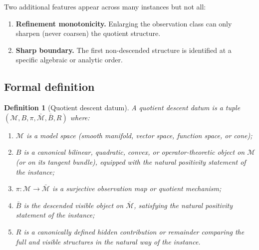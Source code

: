 \documentclass[11pt,a4paper]{article}
\numberwithin{equation}{section}
\theoremstyle{thmcompact}
\newtheorem{definition}[theorem]{Definition}
\theoremstyle{remark}
\begin{document}
Two additional features appear across many instances but not all:

\begin{enumerate}[label=(\roman*),start=6]
\item \textbf{Refinement monotonicity.} Enlarging the observation class can only sharpen (never coarsen) the quotient structure.
\item \textbf{Sharp boundary.} The first non-descended structure is identified at a specific algebraic or analytic order.
\end{enumerate}

\subsection{Formal definition}

\begin{definition}[Quotient descent datum]\label{def:qdd}
A \emph{quotient descent datum} is a tuple $(\mathcal{M}, B, \pi, \bar{\mathcal{M}}, \bar{B}, R)$ where:
\begin{enumerate}[label=(\alph*)]
\item $\mathcal{M}$ is a model space (smooth manifold, vector space, function space, or cone);
\item $B$ is a canonical bilinear, quadratic, convex, or operator-theoretic object on $\mathcal{M}$ (or on its tangent bundle), equipped with the natural positivity statement of the instance;
\item $\pi: \mathcal{M} \to \bar{\mathcal{M}}$ is a surjective observation map or quotient mechanism;
\item $\bar{B}$ is the descended visible object on $\bar{\mathcal{M}}$, satisfying the natural positivity statement of the instance;
\item $R$ is a canonically defined hidden contribution or remainder comparing the full and visible structures in the natural way of the instance.
\end{enumerate}
\end{definition}
\end{document}
